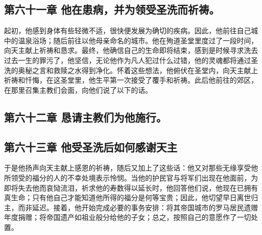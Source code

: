 
\subsection{第六十一章 他在患病，并为领受圣洗而祈祷。}

起初，他感到身体有些轻微不适，很快便发展为确切的疾病。因此，他前往自己城中的温泉浴场；随后前往以他母亲命名的城市。他在殉道圣堂里度过了一段时间，向天主献上祈祷和恳求。最终，他确信自己的生命即将结束，感到是时候寻求洗去过去一生的罪污了，他坚信，无论他作为凡人犯过什么过错，他的灵魂都将通过圣洗的奥秘之言和救赎之水得到净化。怀着这些想法，他俯伏在圣堂内，向天主献上祈祷和忏悔，在这圣堂里，他生平第一次接受了覆手和祈祷。此后他前往的郊区，在那里召集主教们会面，向他们说了以下的话。\par


\subsection{第六十二章 恳请主教们为他施行。}

\par


\subsection{第六十三章 他受圣洗后如何感谢天主}

于是他扬声向天主献上感恩的祈祷，随后又加上了这些话：他又对那些无缘享受他所领受的福分的人的不幸处境表示怜悯。当他的护民官与将军们出现在他面前，为即将失去他而哀恸流泪，祈求他的寿数得以延长时，他回答他们说，他现在已拥有真生命；只有他自己才能知道他所得的福分是何等宝贵；因此，他切望早日离世归主，而非延迟。接着，他开始完成必要的事务安排：将其帝国城市的罗马居民遗赠年度捐赠；将帝国遗产如祖业般分给他的子女；总之，按照自己的意愿作了一切处置。\par

